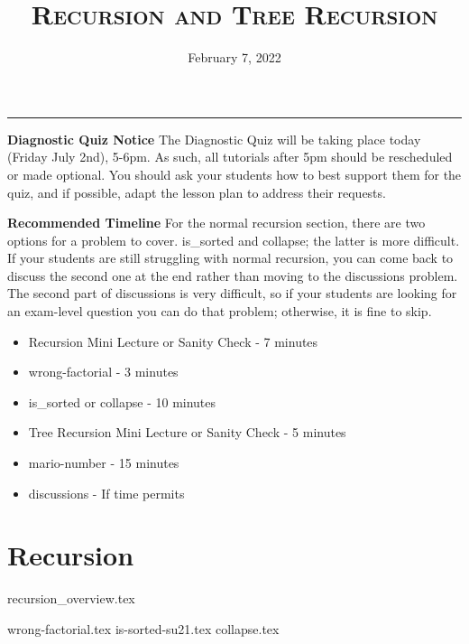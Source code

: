 \documentclass{exam}
\title{\textsc{Recursion and Tree Recursion}}
\date{February 7, 2022}
\begin{document}
\maketitle
\rule{\textwidth}{0.15em}
\fontsize{12}{15}\selectfont

\begin{guide}
\textbf{Diagnostic Quiz Notice}
    \newline
    The Diagnostic Quiz will be taking place today (Friday July 2nd), 5-6pm. As such, all tutorials after 5pm should be rescheduled or made optional.
    You should ask your students how to best support them for the quiz, and if possible, adapt the lesson plan to address their requests.
\end{guide}

\begin{guide}
\textbf{Recommended Timeline}
\newline
For the normal recursion section, there are two options for a problem to cover. is\_sorted and collapse; the latter is more difficult.
If your students are still struggling with normal recursion, you can come back to discuss the second one at the end rather than moving
to the discussions problem. The second part of discussions is very difficult, so if your students are looking for an exam-level question
you can do that problem; otherwise, it is fine to skip.
\begin{itemize}
    \item Recursion Mini Lecture or Sanity Check - 7 minutes
    \item wrong-factorial - 3 minutes
    \item is\_sorted or collapse - 10 minutes
    \item Tree Recursion Mini Lecture or Sanity Check - 5 minutes
    \item mario-number - 15 minutes
    \item discussions - If time permits
\end{itemize}
\end{guide}

\section{Recursion}
{recursion_overview.tex}
\begin{questions}
    {wrong-factorial.tex}
    \pagebreak
    {is-sorted-su21.tex}
    {collapse.tex}
\end{questions}
\end{document}
